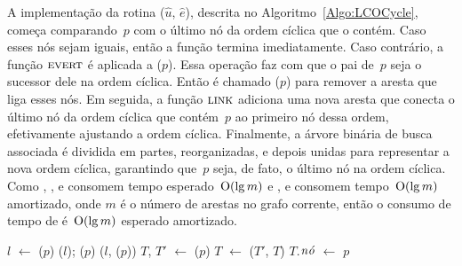 A implementação da rotina \LCOCycle($\hat u$, $\hat e$), descrita no Algoritmo~\ref{Algo:LCOCycle}, começa comparando~$p$ com o último nó da ordem cíclica que o contém.
Caso esses nós sejam iguais, então a função termina imediatamente.
Caso contrário, a função $\text{\scshape \text{\scshape evert}}$ é aplicada a \treapLast($p$).
Essa operação faz com que o pai de~$p$ seja o sucessor dele na ordem cíclica.
Então é chamado \linkcutDelEdge($p$) para remover a aresta que liga esses nós.
Em seguida, a função $\text{\scshape link}$ adiciona uma nova aresta que conecta o último nó da ordem cíclica que contém~$p$ ao primeiro nó dessa ordem, efetivamente ajustando a ordem cíclica.
Finalmente, a árvore binária de busca associada é dividida em partes, reorganizadas, e depois unidas para representar a nova ordem cíclica, garantindo que~$p$ seja, de fato, o último nó na ordem cíclica.
Como \treapFirst{}, \treapLast{}, \treapSplitRight{} e \treapJoin{} consomem tempo esperado~$\mathrm{O}(\lg m)$ e \linkcutEvert{}, \linkcutDelEdge{} e \linkcutAddEdge{} consomem tempo~$\mathrm{O}(\lg m)$ amortizado, onde $m$ é o número de arestas no grafo corrente, então o consumo de tempo de \LCOCycle{} é~$\mathrm{O}(\lg m)$ esperado amortizado.


\begin{algorithm}[h!]
\caption{\LCOCycle($p$)}
\label{Algo:LCOCycle}
\begin{algorithmic}[1]
\State $l$ $\gets$ \treapLast($p$)
\State\Return
\EndIf
\State \linkcutEvert($l$); \linkcutDelEdge($p$)
\State \linkcutAddEdge($l$, \treapFirst($p$))
\State $T$, $T'$ $\gets$ \treapSplitRight($p$)
\State $T$ $\gets$ \treapJoin($T'$, $T$)
\State $T$.$\mathit{n\acute{o}}$ $\gets$ $p$
\end{algorithmic}
\end{algorithm}
